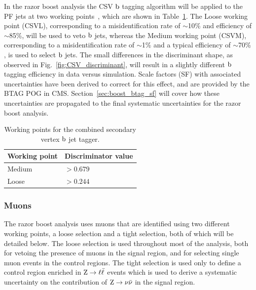 In the razor boost analysis the CSV $\mathrm{b}$ tagging algorithm will be applied to the PF jets at two
working points~\cite{BTagWP}, which are shown in Table~\ref{tab:object_btag}. 
The Loose working point (CSVL), corresponding to a misidentification rate of $\sim$10\% and
efficiency of $\sim$85\%, will be used to veto $\mathrm{b}$ jets, whereas the Medium working point
(CSVM), corresponding to a misidentification rate of $\sim$1\% and a typical efficiency of
$\sim$70\% , is used to select $\mathrm{b}$ jets.
The small differences in the discriminant shape, as observed in Fig.~\ref{fig:CSV_discriminant}, 
will result in a slightly different $\mathrm{b}$ tagging efficiency in data versus simulation. Scale
factors (SF) with associated uncertainties have been derived to correct for this effect, and are
provided by the BTAG POG in CMS. Section~\ref{sec:boost_btag_sf} will cover how these
uncertainties are propagated to the final systematic uncertainties for the razor boost analysis. 



\begin{table}[htdp]
\caption{Working points for the combined secondary vertex $\mathrm{b}$ jet tagger.
\label{tab:object_btag}}
\begin{center}
\begin{tabular}{l l}
\toprule
Working point & Discriminator value \\
\midrule
Medium & $> 0.679$ \\
Loose & $> 0.244$ \\
\bottomrule
\end{tabular}
\end{center}
\end{table}



\subsubsection{Muons \label{sec:object_muon}}

The razor boost analysis uses muons that are identified using two different working
points, a loose selection and a tight selection, both of which will be detailed below. 
The loose selection is used throughout most of the analysis, both for vetoing the presence of muons
in the signal region, and for selecting single muon events in the control regions. The tight
selection is used only to define a control region enriched in $\mathrm{Z}\rightarrow
\ell\bar{\ell}$ events which is used to derive a systematic uncertainty on the contribution of
$\mathrm{Z}\rightarrow \nu\bar{\nu}$ in the signal region. 

